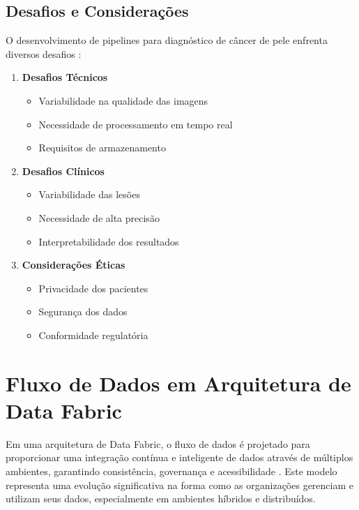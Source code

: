 \subsection{Desafios e Considerações}

O desenvolvimento de pipelines para diagnóstico de câncer de pele enfrenta diversos desafios \cite{chen2023challenges}:

\begin{enumerate}
\item \textbf{Desafios Técnicos}
\begin{itemize}
\item Variabilidade na qualidade das imagens
\item Necessidade de processamento em tempo real
\item Requisitos de armazenamento
\end{itemize}
\item \textbf{Desafios Clínicos}
\begin{itemize}
    \item Variabilidade das lesões
    \item Necessidade de alta precisão
    \item Interpretabilidade dos resultados
\end{itemize}

\item \textbf{Considerações Éticas}
\begin{itemize}
    \item Privacidade dos pacientes
    \item Segurança dos dados
    \item Conformidade regulatória
\end{itemize}
\end{enumerate}

\section{Fluxo de Dados em Arquitetura de Data Fabric}

Em uma arquitetura de Data Fabric, o fluxo de dados é projetado para proporcionar uma integração contínua e inteligente de dados através de múltiplos ambientes, garantindo consistência, governança e acessibilidade \cite{sharma2023data}. Este modelo representa uma evolução significativa na forma como as organizações gerenciam e utilizam seus dados, especialmente em ambientes híbridos e distribuídos.







